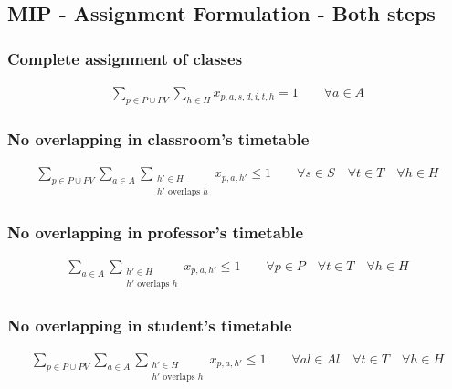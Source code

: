 \subsection{MIP - Assignment Formulation - Both steps}

\subsubsection{Complete assignment of classes}
\begin{eqnarray}
\sum\limits_{p \in P \cup PV}\sum\limits_{h \in H} x_{p,a,s,d,i,t,h} =  1 \nonumber \qquad 
\forall a \in A 
\end{eqnarray}

\subsubsection{No overlapping in classroom's timetable}
\begin{eqnarray}
\sum\limits_{p \in P \cup PV} \sum\limits_{a \in A} \sum\limits_{\substack {h' \in H \\ h'\mbox{ overlaps }h}} x_{p,a,h'} \leq  1 \nonumber \qquad 
\forall s \in S \quad
\forall t \in T \quad
\forall h \in H
\end{eqnarray}

\subsubsection{No overlapping in professor's timetable}
\begin{eqnarray}
\sum\limits_{a \in A} \sum\limits_{\substack {h' \in H \\ h'\mbox{ overlaps }h}} x_{p,a,h'} \leq  1 \nonumber \qquad 
\forall p \in P \quad
\forall t \in T \quad
\forall h \in H
\end{eqnarray}

\subsubsection{No overlapping in student's timetable}
\begin{eqnarray}
\sum\limits_{p \in P \cup PV} \sum\limits_{a \in A} \sum\limits_{\substack {h' \in H \\ h'\mbox{ overlaps }h}}
  x_{p,a,h'} \leq  1 \nonumber \qquad 
\forall al \in Al \quad
\forall t \in T \quad
\forall h \in H
\end{eqnarray}

